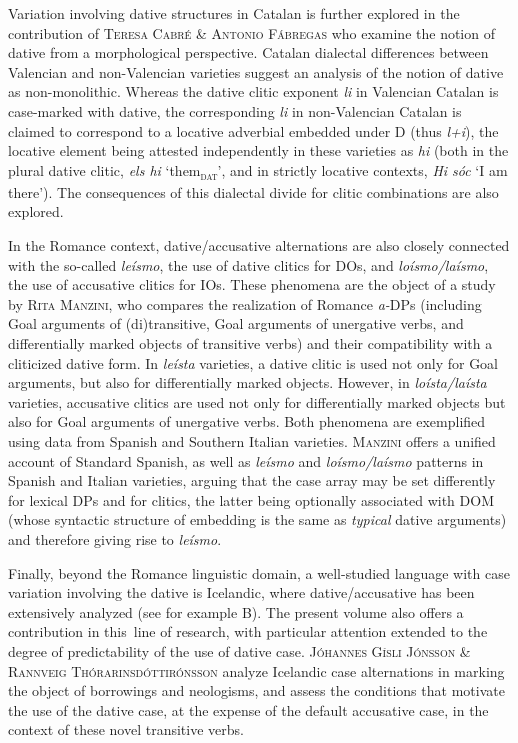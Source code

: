 \documentclass[output=paper,modfonts,nonflat,colorlinks,citecolor=brown]{langsci/langscibook}
\begin{document}
Variation involving dative structures in Catalan is further explored in  the contribution of {\textsc{Teresa Cabré \& Antonio Fábregas}} who examine the notion of dative from a morphological perspective. Catalan dialectal differences between Valencian and non-Valencian varieties suggest an analysis of the notion of dative as non-monolithic. Whereas the dative clitic exponent {\textit{li}} in Valencian Catalan is case-marked with dative, the corresponding {\textit{li}} in non-Valencian Catalan is claimed to correspond to a locative adverbial embedded under D (thus {\textit{l+i}}), the locative element being attested independently in these varieties as {\textit{hi}} (both in the plural dative clitic, {\textit{els hi}} ‘them{\textsc{\textsubscript{dat}}}’, and in strictly locative contexts, {\textit{Hi sóc}} ‘I am there’). The consequences of this dialectal divide for clitic combinations are also explored.



In the Romance context, dative/accusative alternations are also closely connected with the so-called {\textit{leísmo}}, the use of dative clitics for DOs, and {\textit{loísmo/laísmo}}, the use of accusative clitics for IOs. These phenomena are the object of a study by {\textsc{Rita Manzini,} who} compares the realization of Romance {\textit{a-}}DPs (including Goal arguments of (di)transitive, Goal arguments of unergative verbs, and differentially marked objects of transitive verbs) and their compatibility with a cliticized dative form. In {\textit{leísta}} varieties, a dative clitic is used not only for Goal arguments, but also for differentially marked objects. However, in {\textit{loísta/laísta}} varieties, accusative clitics are used not only for differentially marked objects but also for Goal arguments of unergative verbs. Both phenomena are exemplified using data from Spanish and Southern Italian varieties. {\textsc{Manzini}} offers a unified account of Standard Spanish, as well as {\textit{leísmo}} and {\textit{loísmo/laísmo}} patterns in Spanish and Italian varieties, arguing that the case array may be set differently for lexical DPs and for clitics, the latter being optionally associated with DOM (whose syntactic structure of embedding is the same as {\textit{typical}} dative arguments) and therefore giving rise to {\textit{leísmo}}.



Finally, beyond the Romance linguistic domain, a well-studied language with case variation involving the dative is Icelandic, where dative/accusative has been extensively analyzed (see for example B\citealt{Barðdal2001, Barðdal2008,Svenonius2002,Maling2002,JónssonEythórsson2005}). The present volume also offers a contribution in this~line of research, with particular attention extended to the degree of predictability of the use of dative case. {\textsc{Jóhannes Gísli Jónsson \& Rannveig Thórarinsdóttirónsson}} analyze Icelandic case alternations in marking the object of borrowings and neologisms, and assess the conditions that motivate the use of the dative case, at the expense of the default accusative case, in the context of these novel transitive verbs.


\sloppy\printbibliography[heading=subbibliography,notkeyword=this]
\end{document}
